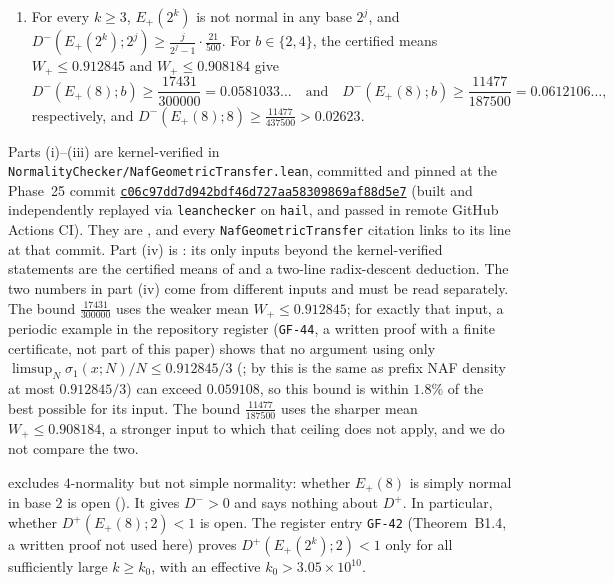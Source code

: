 \documentclass[11pt]{article}
\newcommand{\ttbreak}{\discretionary{}{}{}}
\newcommand{\ttt}[1]{\texttt{\begingroup\def\_{\textunderscore\ttbreak}#1\endgroup}}
\newcommand{\tpath}[1]{\nolinkurl{#1}}
\newcommand{\phaseXXVcommit}{c06c97dd7d942bdf46d727aa58309869af88d5e7}
\newcommand{\commitref}[1]{\href{https://github.com/eldernos/MathematicsResearch/commit/#1}{\expandafter\nolinkurl\expandafter{#1}}}
\begin{document}
\begin{maintheorem}
\begin{enumerate}[label=\textup{(\roman*)},nosep]
\[
D_N(E_+(2^k);2)\ge\frac{21}{500}\quad\text{and}\quad D_N(E_+(2^k);4)\ge\frac{21}{500}\qquad\text{for all large }N,
\]
and $E_+(2^k)$ is not $4$-normal in base $2$, not $2$-normal in base $4$, and not normal in base $2$ or in base $4$.
\item {} For every $k\ge3$, $E_+(2^k)$ is not normal in any base $2^j$, and $D^-(E_+(2^k);2^j)\ge\frac{j}{2^j-1}\cdot\frac{21}{500}$. For $b\in\{2,4\}$, the certified means $W_+\le0.912845$ and $W_+\le0.908184$ give
\[
D^-(E_+(8);b)\ge\frac{17431}{300000}=0.0581033\ldots\quad\text{and}\quad D^-(E_+(8);b)\ge\frac{11477}{187500}=0.0612106\ldots,
\]
respectively, and $D^-(E_+(8);8)\ge\frac{11477}{437500}>0.02623$.
\end{enumerate}
\end{maintheorem}

Parts (i)--(iii) are kernel-verified in \tpath{NormalityChecker/NafGeometricTransfer.lean}, committed and pinned at the Phase~25 commit \commitref{\phaseXXVcommit} (built and independently replayed via \ttt{leanchecker} on \ttt{hail}, and passed in remote GitHub Actions CI). They are , and every \ttt{NafGeometricTransfer} citation links to its line at that commit. Part (iv) is : its only inputs beyond the kernel-verified statements are the certified means of  and a two-line radix-descent deduction. The two numbers in part (iv) come from different inputs and must be read separately. The bound $\frac{17431}{300000}$ uses the weaker mean $W_+\le0.912845$; for exactly that input, a periodic example in the repository register (\ttt{GF-44}, a written proof with a finite certificate, not part of this paper) shows that no argument using only $\limsup_N\sigma_1(x;N)/N\le0.912845/3$ (; by  this is the same as prefix NAF density at most $0.912845/3$) can exceed $0.059108$, so this bound is within $1.8\%$ of the best possible for its input. The bound $\frac{11477}{187500}$ uses the sharper mean $W_+\le0.908184$, a stronger input to which that ceiling does not apply, and we do not compare the two.

 excludes $4$-normality but not simple normality: whether $E_+(8)$ is simply normal in base $2$ is open (). It gives $D^->0$ and says nothing about $D^+$. In particular, whether $D^+(E_+(8);2)<1$ is open. The register entry \ttt{GF-42} (Theorem~B1.4, a written proof not used here) proves $D^+(E_+(2^k);2)<1$ only for all sufficiently large $k\ge k_0$, with an effective $k_0>3.05\times10^{10}$.
\end{document}
